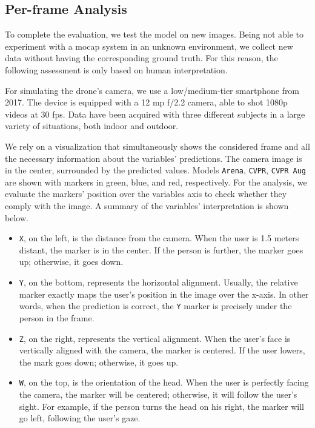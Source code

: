 


\subsection{Per-frame Analysis}
\label{subsec:ql-interactive}

To complete the evaluation, we test the model on new images. Being not able to experiment with a \gls{mocap} system in an unknown environment, we collect new data without having the corresponding ground truth. For this reason, the following assessment is only based on human interpretation.

For simulating the drone's camera, we use a low/medium-tier smartphone from 2017. The device is equipped with a 12 \gls{mp} f/2.2 camera, able to shot 1080p videos at 30 \gls{fps}. Data have been acquired with three different subjects in a large variety of situations, both indoor and outdoor.

We rely on a visualization that simultaneously shows the considered frame and all the necessary information about the variables' predictions. The camera image is in the center, surrounded by the predicted values. Models \texttt{Arena}, \texttt{CVPR}, \texttt{CVPR Aug} are shown with markers in green, blue, and red, respectively. For the analysis, we evaluate the markers' position over the variables axis to check whether they comply with the image. A summary of the variables' interpretation is shown below.

\begin{itemize}
    \item \texttt{X}, on the left, is the distance from the camera. When the user is 1.5 meters distant, the marker is in the center. If the person is further, the marker goes up; otherwise, it goes down.
    \item \texttt{Y}, on the bottom, represents the horizontal alignment. Usually, the relative marker exactly maps the user's position in the image over the x-axis. In other words, when the prediction is correct, the \texttt{Y} marker is precisely under the person in the frame.
    \item \texttt{Z}, on the right, represents the vertical alignment. When the user's face is vertically aligned with the camera, the marker is centered.
    If the user lowers, the mark goes down; otherwise, it goes up.
    \item \texttt{W}, on the top, is the orientation of the head. When the user is perfectly facing the camera, the marker will be centered; otherwise, it will follow the user's sight. For example, if the person turns the head on his right, the marker will go left, following the user's gaze.
\end{itemize}

